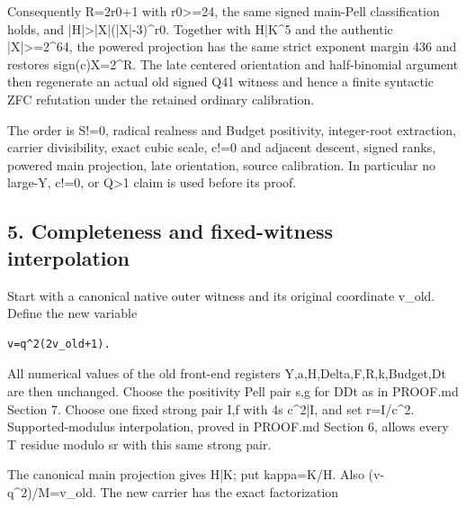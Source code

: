 Consequently R=\allowbreak{}2r0+\allowbreak{}1 with r0\textgreater{}\allowbreak{}=\allowbreak{}24, the same signed main-Pell classification holds, and |H|\textgreater{}\allowbreak{}|X|(|X|-3)\textasciicircum{}\allowbreak{}r0. Together with H|K\textasciicircum{}\allowbreak{}5 and the authentic |X|\textgreater{}\allowbreak{}=\allowbreak{}2\textasciicircum{}\allowbreak{}64, the powered projection has the same strict exponent margin 436 and restores sign(c)X=\allowbreak{}2\textasciicircum{}\allowbreak{}R. The late centered orientation and half-binomial argument then regenerate an actual old signed Q41 witness and hence a finite syntactic ZFC refutation under the retained ordinary calibration.



The order is S!=\allowbreak{}0, radical realness and Budget positivity, integer-root extraction, carrier divisibility, exact cubic scale, c!=\allowbreak{}0 and adjacent descent, signed ranks, powered main projection, late orientation, source calibration. In particular no large-Y, c!=\allowbreak{}0, or Q\textgreater{}\allowbreak{}1 claim is used before its proof.



\subsection*{5. Completeness and fixed-witness interpolation}



Start with a canonical native outer witness and its original coordinate v\_\allowbreak{}old. Define the new variable



\begin{verbatim}
v=q^2(2v_old+1).
\end{verbatim}

All numerical values of the old front-end registers Y,a,H,Delta,F,R,k,Budget,Dt are then unchanged. Choose the positivity Pell pair s,g for D\textasteriskcentered{}\allowbreak{}Dt as in PROOF.md Section 7. Choose one fixed strong pair I,f with 4s c\textasciicircum{}\allowbreak{}2|I, and set r=\allowbreak{}I/\allowbreak{}c\textasciicircum{}\allowbreak{}2. Supported-modulus interpolation, proved in PROOF.md Section 6, allows every T residue modulo sr with this same strong pair.



The canonical main projection gives H|K; put kappa=\allowbreak{}K/\allowbreak{}H. Also (v-q\textasciicircum{}\allowbreak{}2)/\allowbreak{}M=\allowbreak{}v\_\allowbreak{}old. The new carrier has the exact factorization



